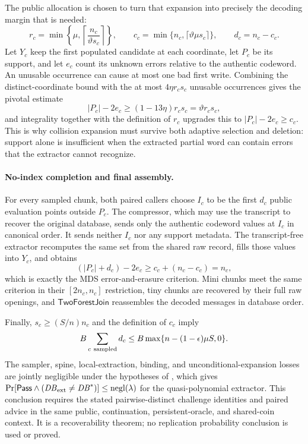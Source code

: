 \documentclass[11pt]{article}
\begin{document}
The public allocation is chosen to turn that expansion into precisely the
decoding margin that is needed:
\[
 r_c=\min\left\{\mu,
       \left\lceil\frac{n_c}{\vartheta s_c}\right\rceil\right\},\qquad
 c_c=\min\{n_c,\lceil\vartheta\mu s_c\rceil\},\qquad
 d_c=n_c-c_c.
\]
Let $Y_c$ keep the first populated candidate at each coordinate, let $P_c$ be
its support, and let $e_c$ count its unknown errors relative to the authentic
codeword.  An unusable occurrence can cause at most one bad first write.
Combining the distinct-coordinate bound with the at most $4\eta r_cs_c$
unusable occurrences gives the pivotal estimate
\[
 |P_c|-2e_c\ge(1-13\eta)r_cs_c
 =\vartheta r_cs_c,
\]
and integrality together with the definition of $r_c$ upgrades this to
$|P_c|-2e_c\ge c_c$.
This is why collision expansion must survive both adaptive selection and
deletion: support alone is insufficient when the extracted partial word can
contain errors that the extractor cannot recognize.

\paragraph{No-index completion and final assembly.}
For every sampled chunk, both paired callers choose $I_c$ to be the first
$d_c$ public evaluation points outside $P_c$.  The compressor, which may use
the transcript to recover the original database, sends only the authentic
codeword values at $I_c$ in canonical order.  It sends neither $I_c$ nor any
support metadata.  The transcript-free extractor recomputes the same set from
the shared raw record, fills those values into $Y_c$, and obtains
\[
 (|P_c|+d_c)-2e_c\ge c_c+(n_c-c_c)=n_c,
\]
which is exactly the MDS error-and-erasure criterion.  Mini chunks meet the
same criterion in their $[2n_c,n_c]$ restriction, tiny chunks are recovered by
their full raw openings, and $\mathsf{TwoForestJoin}$ reassembles the decoded
messages in database order.

Finally, $s_c\ge(S/n)n_c$ and the definition of $c_c$ imply
\[
 B\sum_{c\ {\rm sampled}}d_c
 \le B\max\{n-(1-\epsilon)\mu S,0\}.
\]
The sampler, spine, local-extraction, binding, and unconditional-expansion
losses are jointly negligible under the hypotheses of , which
gives
$\Pr[\mathsf{Pass}\wedge(\mathit{DB}_{\rm ext}\ne\mathit{DB}^{*})]
\le\operatorname{negl}(\lambda)$ for the quasi-polynomial extractor.  This
conclusion requires the stated pairwise-distinct challenge identities and
paired advice in the same public, continuation, persistent-oracle, and
shared-coin context.  It is a recoverability theorem; no replication
probability conclusion is used or proved.
\end{document}
